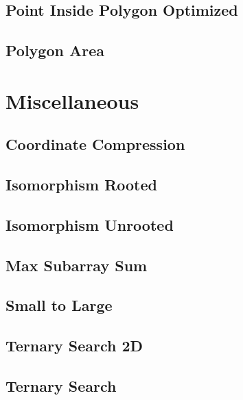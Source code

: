 \subsection{Point Inside Polygon Optimized}
\raggedbottom
\hrulefill
\subsection{Polygon Area}
\raggedbottom
\hrulefill

\section{Miscellaneous}
\subsection{Coordinate Compression}
\raggedbottom
\hrulefill
\subsection{Isomorphism Rooted}
\raggedbottom
\hrulefill
\subsection{Isomorphism Unrooted}
\raggedbottom
\hrulefill
\subsection{Max Subarray Sum}
\raggedbottom
\hrulefill
\subsection{Small to Large}
\raggedbottom
\hrulefill
\subsection{Ternary Search 2D}
\raggedbottom
\hrulefill
\subsection{Ternary Search}
\raggedbottom
\hrulefill

